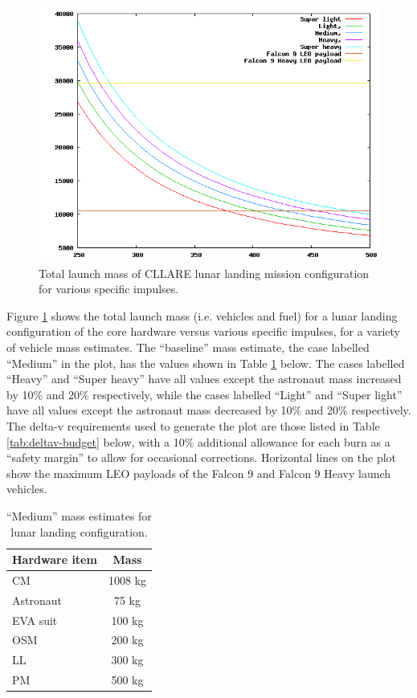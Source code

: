 \documentclass{report}
\begin{document}
\begin{figure}[h] \label{fig:fuel_analysis}
\includegraphics[scale=0.6]{images/fuel_analysis}
\caption{Total launch mass of CLLARE lunar landing mission configuration for various specific impulses.}
\end{figure}

Figure \ref{fig:fuel_analysis} shows the total launch mass (i.e. vehicles and fuel) for a lunar landing configuration of the core hardware versus various specific impulses, for a variety of vehicle mass estimates.  The ``baseline'' mass estimate, the case labelled ``Medium'' in the plot, has the values shown in Table \ref{tab:fuel_analysis} below.  The cases labelled ``Heavy'' and ``Super heavy'' have all values except the astronaut mass increased by 10\% and 20\% respectively, while the cases labelled ``Light'' and ``Super light'' have all values except the astronaut mass decreased by 10\% and 20\% respectively.  The delta-v requirements used to generate the plot are those listed in Table \ref{tab:deltav-budget} below, with a 10\% additional allowance for each burn as a ``safety margin'' to allow for occasional corrections.  Horizontal lines on the plot show the maximum LEO payloads of the Falcon 9 and Falcon 9 Heavy launch vehicles.

\begin{table} \label{tab:fuel_analysis}
\centering
\caption{``Medium'' mass estimates for lunar landing configuration.}
\begin{tabular}{ | l | c | }
\hline
\textbf{Hardware item} & \textbf{Mass} \\
\hline
\hline
CM		& 1008 kg \\
\hline
Astronaut	& 75 kg \\
\hline
EVA suit	& 100 kg \\
\hline
OSM		& 200 kg \\
\hline
LL		& 300 kg \\
\hline
PM		& 500 kg \\
\hline
\end{tabular}
\end{table}
\end{document}
